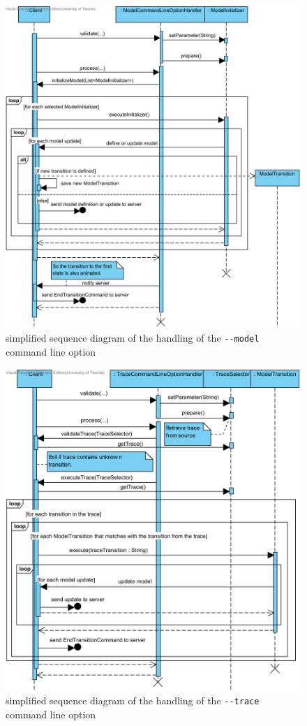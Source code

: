 \begin{figure}[ht]
  \centering
  \includegraphics[width=1.1\textwidth]{diagrams/SD_client_model}
  \caption{simplified sequence diagram of the handling of the \lstinline{--model} command line option}\label{fig:sd_client_model}
\end{figure}
\begin{figure}[ht]
  \centering
  \includegraphics[width=1.1\textwidth]{diagrams/SD_client_trace}
  \caption{simplified sequence diagram of the handling of the \lstinline{--trace} command line option}\label{fig:sd_client_trace}
\end{figure}
